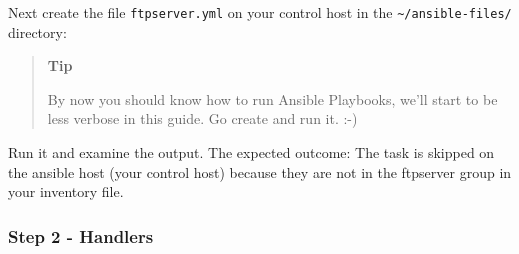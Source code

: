 Next create the file \texttt{ftpserver.yml} on your control host in the
\texttt{\textasciitilde{}/ansible-files/} directory:

\begin{Shaded}
\begin{Highlighting}[]
\PreprocessorTok{{-}{-}{-}}
\KeywordTok{{-}}\AttributeTok{ }\KeywordTok{:}
\AttributeTok{  }\KeywordTok{:}
\AttributeTok{  }\KeywordTok{:}\AttributeTok{ }
\AttributeTok{  }\KeywordTok{:}
\AttributeTok{    }\KeywordTok{{-}}\AttributeTok{ }\KeywordTok{:}
\AttributeTok{      }\KeywordTok{:}
\AttributeTok{        }\KeywordTok{:}
\AttributeTok{        }\KeywordTok{:}
\AttributeTok{      }\KeywordTok{:}
\end{Highlighting}
\end{Shaded}

\begin{quote}
\textbf{Tip}

By now you should know how to run Ansible Playbooks, we'll start to be
less verbose in this guide. Go create and run it. :-)
\end{quote}

Run it and examine the output. The expected outcome: The task is skipped
on the ansible host (your control host) because they
are not in the ftpserver group in your inventory file.

\begin{Shaded}
\begin{Highlighting}[]
\PreprocessorTok{**************}
 \PreprocessorTok{[}\PreprocessorTok{]}
 \PreprocessorTok{[}\PreprocessorTok{]}
\end{Highlighting}
\end{Shaded}

\hypertarget{step-2---handlers}{%
\subsubsection{Step 2 - Handlers}\label{step-2---handlers}}


